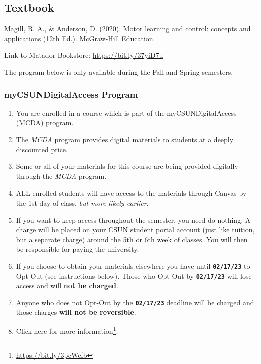 \documentclass[
  letterpaper,
  DIV=11,
  numbers=noendperiod]{scrartcl}
\providecommand{\tightlist}{%
  \setlength{\itemsep}{0pt}\setlength{\parskip}{0pt}}\usepackage{longtable,booktabs,array}
\DeclareRobustCommand{\href}[2]{#2\footnote{\url{#1}}}
\begin{document}
\hypertarget{textbook}{%
\subsection{Textbook}\label{textbook}}

Magill, R. A., \& Anderson, D. (2020). Motor learning and control:
concepts and applications (12th Ed.). McGraw-Hill Education.

Link to Matador Bookstore: \url{https://bit.ly/37yiD7u}

\begin{tcolorbox}[enhanced jigsaw, leftrule=.75mm, breakable, opacityback=0, bottomrule=.15mm, rightrule=.15mm, colbacktitle=quarto-callout-note-color!10!white, colframe=quarto-callout-note-color-frame, arc=.35mm, bottomtitle=1mm, left=2mm, title=\textcolor{quarto-callout-note-color}{\faInfo}\hspace{0.5em}{Note}, titlerule=0mm, toptitle=1mm, toprule=.15mm, opacitybacktitle=0.6, colback=white, coltitle=black]

The program below is only available during the Fall and Spring
semesters.

\end{tcolorbox}

\hypertarget{sec-mycsundigitalaccess}{%
\subsubsection{myCSUNDigitalAccess
Program}\label{sec-mycsundigitalaccess}}

\begin{enumerate}
\def\labelenumi{\arabic{enumi}.}
\tightlist
\item
  You are enrolled in a course which is part of the myCSUNDigitalAccess
  (MCDA) program.
\item
  The \emph{MCDA} program provides digital materials to students at a
  deeply discounted price.
\item
  Some or all of your materials for this course are being provided
  digitally through the \emph{MCDA} program.
\item
  ALL enrolled students will have access to the materials through Canvas
  by the 1st day of class, \emph{but more likely earlier}.
\item
  If you want to keep access throughout the semester, you need do
  nothing. A charge will be placed on your CSUN student portal account
  (just like tuition, but a separate charge) around the 5th or 6th week
  of classes. You will then be responsible for paying the university.
\item
  If you choose to obtain your materials elsewhere you have until
  \textbf{\texttt{02/17/23}} to Opt-Out (see instructions below). Those
  who Opt-Out by \textbf{\texttt{02/17/23}} will lose access and will
  \textbf{not be charged}.
\item
  Anyone who does not Opt-Out by the \textbf{\texttt{02/17/23}} deadline
  will be charged and those charges \textbf{will not be reversible}.
\item
  \href{https://bit.ly/3pcWcfb}{Click here for more information}.
\end{enumerate}
\end{document}
